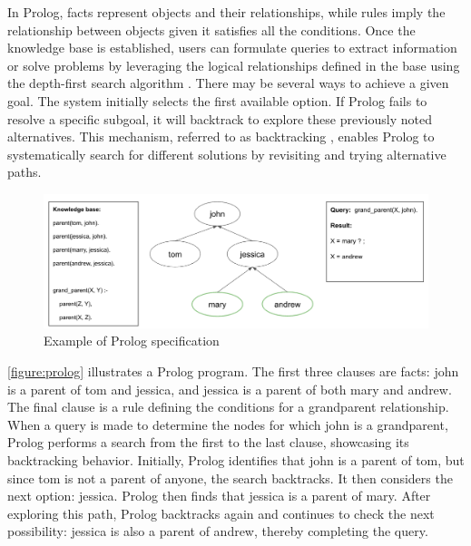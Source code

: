 In Prolog, facts represent objects and their relationships, while rules imply the relationship between objects given it satisfies all the conditions. Once the knowledge base is established, users can formulate queries to extract information or solve problems by leveraging the logical relationships defined in the base using the depth-first search algorithm \cite{Chowdhary2020}. There may be several ways to achieve a given goal. The system initially selects the first available option. If Prolog fails to resolve a specific subgoal, it will backtrack to explore these previously noted alternatives. This mechanism, referred to as backtracking \cite{Chowdhary2020}, enables Prolog to systematically search for different solutions by revisiting and trying alternative paths.

\begin{figure}[h]
    \centering
    \includegraphics[width=1\textwidth]{Packages/Prolog.png}
    \caption{Example of Prolog specification}
    \label{figure:prolog}
\end{figure}

\autoref{figure:prolog} illustrates a Prolog program. The first three clauses are facts: john is a parent of tom and jessica, and jessica is a parent of both mary and andrew. The final clause is a rule defining the conditions for a grandparent relationship. When a query is made to determine the nodes for which john is a grandparent, Prolog performs a search from the first to the last clause, showcasing its backtracking behavior. Initially, Prolog identifies that john is a parent of tom, but since tom is not a parent of anyone, the search backtracks. It then considers the next option: jessica. Prolog then finds that jessica is a parent of mary. After exploring this path, Prolog backtracks again and continues to check the next possibility: jessica is also a parent of andrew, thereby completing the query.

\newpage

